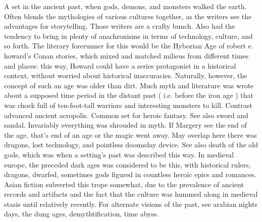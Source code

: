 \documentclass[12pt]{book}
\begin{document}
A set in the ancient past, when gods, demons, and monsters walked the earth. Often blends the mythologies of various cultures together, as the writers see the advantages for storytelling. Those writers are a crafty bunch. Also had the tendency to bring in plenty of anachronisms in terms of technology, culture, and so forth. The literary forerunner for this would be the Hyborian Age of robert e. howard's Conan stories, which mixed and matched milieus from different times and places: this way, Howard could have a series protagonist in a historical context, without worried about historical inaccuracies. Naturally, however, the concept of such an age was older than dirt. Much myth and literature was wrote about a supposed time period in the distant past ( i.e. before the iron age ) that was chock full of ten-foot-tall warriors and interesting monsters to kill. Contrast advanced ancient acropolis. Common set for heroic fantasy. See also sword and sandal. Invariably everything was shrouded in myth. If Margery see the end of the age, that's end of an age or the magic went away. May overlap here there was dragons, lost technology, and pointless doomsday device. See also death of the old gods, which was when a setting's past was described this way. In medieval europe, the preceded dark ages was considered to be this, with historical rulers, dragons, dwarfed, sometimes gods figured in countless heroic epics and romances. Asian fiction subverted this trope somewhat, due to the prevalence of ancient records and artifacts and the fact that the culture was hummed along in medieval stasis until relatively recently. For alternate visions of the past, see arabian nights days, the dung ages, demythtification, time abyss.
\end{document}
